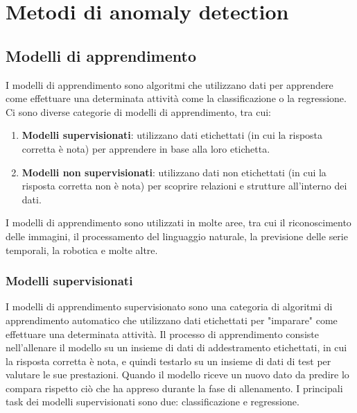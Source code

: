 \chapter{Metodi di anomaly detection}
\label{chap:methods}

\section{Modelli di apprendimento}
I modelli di apprendimento sono algoritmi che utilizzano dati per apprendere come effettuare una determinata attività come la classificazione o la regressione. Ci sono diverse categorie di modelli di apprendimento, tra cui:
\begin{enumerate}
\item \textbf{Modelli supervisionati}: utilizzano dati etichettati (in cui la risposta corretta è nota) per apprendere in base alla loro etichetta.
\item \textbf{Modelli non supervisionati}: utilizzano dati non etichettati (in cui la risposta corretta non è nota) per scoprire relazioni e strutture all'interno dei dati.
\end{enumerate}

I modelli di apprendimento sono utilizzati in molte aree, tra cui il riconoscimento delle immagini, il processamento del linguaggio naturale, la previsione delle serie temporali, la robotica e molte altre.

\subsection{Modelli supervisionati}
I modelli di apprendimento supervisionato sono una categoria di algoritmi di apprendimento automatico che utilizzano dati etichettati per "imparare" come effettuare una determinata attività. Il processo di apprendimento consiste nell'allenare il modello su un insieme di dati di addestramento etichettati, in cui la risposta corretta è nota, e quindi testarlo su un insieme di dati di test per valutare le sue prestazioni. Quando il modello riceve un nuovo dato da predire lo compara rispetto ciò che ha appreso durante la fase di allenamento. I principali task dei modelli supervisionati sono due: classificazione e regressione.

